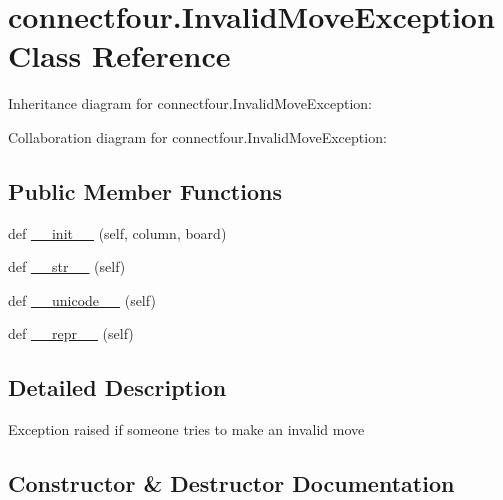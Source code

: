 \hypertarget{classconnectfour_1_1_invalid_move_exception}{}\section{connectfour.\+Invalid\+Move\+Exception Class Reference}
\label{classconnectfour_1_1_invalid_move_exception}


Inheritance diagram for connectfour.\+Invalid\+Move\+Exception\+:


Collaboration diagram for connectfour.\+Invalid\+Move\+Exception\+:
\subsection*{Public Member Functions}
\begin{DoxyCompactItemize}
\item 
def \hyperlink{classconnectfour_1_1_invalid_move_exception_aeadda78b3ceb8cdbce014323cbf486d1}{\+\_\+\+\_\+init\+\_\+\+\_\+} (self, column, board)
\item 
def \hyperlink{classconnectfour_1_1_invalid_move_exception_a3867e7abf1536c1d6bbcc7898c2b47e0}{\+\_\+\+\_\+str\+\_\+\+\_\+} (self)
\item 
def \hyperlink{classconnectfour_1_1_invalid_move_exception_a287bff98a6ab2834db4adfffd4e44b42}{\+\_\+\+\_\+unicode\+\_\+\+\_\+} (self)
\item 
def \hyperlink{classconnectfour_1_1_invalid_move_exception_adbbe69444362b192b454845d528941f4}{\+\_\+\+\_\+repr\+\_\+\+\_\+} (self)
\end{DoxyCompactItemize}


\subsection{Detailed Description}
\begin{DoxyVerb}Exception raised if someone tries to make an invalid move \end{DoxyVerb}
 

\subsection{Constructor \& Destructor Documentation}
\hypertarget{classconnectfour_1_1_invalid_move_exception_aeadda78b3ceb8cdbce014323cbf486d1}{}
